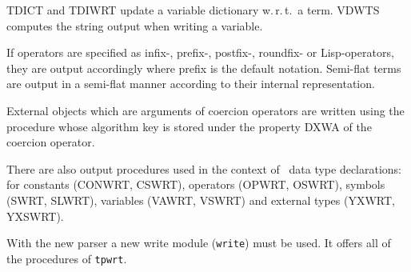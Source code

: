TDICT and TDIWRT update a variable dictionary w.\,r.\,t.\ a term.
VDWTS computes the string output when writing a variable.

If operators are specified as infix-, prefix-, postfix-, roundfix- or
Lisp-operators, they are output accordingly where prefix is the default
notation.
Semi-flat terms are output in a semi-flat manner according to their internal
representation.

External objects which are arguments of coercion operators are written using 
the procedure whose algorithm key is stored under the property DXWA of
the coercion operator.

There are also output procedures used in the context of \redux\ data type
declarations:
for constants (CONWRT, CSWRT), operators (OPWRT, OSWRT), symbols 
(SWRT, SLWRT), variables (VAWRT, VSWRT) and external types
(YXWRT, YXSWRT).

With the new parser a new write module ({\tt write}) must be used.
It offers all of the procedures of {\tt tpwrt}.

